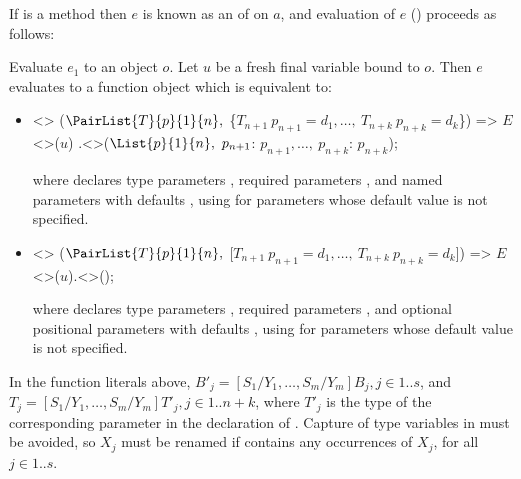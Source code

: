 \documentclass[makeidx]{article}
\begin{document}

\LMHash{}%
If \id{} is a method then $e$ is known as an
of \id{} on $a$,
and evaluation of $e$
()
proceeds as follows:

\LMHash{}%
Evaluate $e_1$ to an object $o$.
Let $u$ be a fresh final variable bound to $o$.
Then $e$ evaluates to a function object which is equivalent to:

\begin{itemize}
\item
\begin{normativeDartCode}
<>
($\PairList{T}{p}{1}{n},\ $\{$T_{n+1}\ p_{n+1} = d_1, \ldots,\ T_{n+k}\ p_{n+k} = d_k$\}) =>
\quad$E$<>($u$)
\quad.\id<>($\List{p}{1}{n},\ p_{n+1}$: $p_{n+1}, \ldots,\ p_{n+k}$: $p_{n+k}$);
\end{normativeDartCode}
  where \id{} declares type parameters
  \TypeParametersStd,
  required parameters ,
  and named parameters  with defaults ,
  using \NULL{} for parameters whose default value is not specified.

\item
\begin{normativeDartCode}
<>
($\PairList{T}{p}{1}{n},\ $[$T_{n+1}\ p_{n+1} = d_1, \ldots,\ T_{n+k}\ p_{n+k} = d_k$]) =>
\quad$E$<>($u$).\id<>();
\end{normativeDartCode}
  where \id{} declares type parameters
  \TypeParametersStd,
  required parameters ,
  and optional positional parameters
   with defaults ,
  using \NULL{} for parameters whose default value is not specified.
\end{itemize}

\LMHash{}%
In the function literals above,
$B'_j = [S_1/Y_1, \ldots, S_m/Y_m]B_j, j \in 1 .. s$,
and $T_j = [S_1/Y_1, \ldots, S_m/Y_m]T'_j, j \in 1 .. n+k$,
where $T'_j$ is the type of the corresponding parameter in
the declaration of \id.
Capture of type variables in  must be avoided,
so $X_j$ must be renamed if  contains any occurrences of $X_j$,
for all $j \in 1 .. s$.
\end{document}
